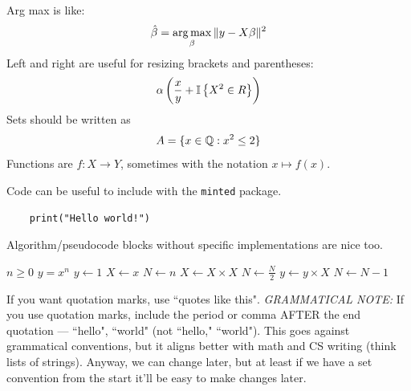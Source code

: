 \documentclass[../../main.tex]{subfiles}
\begin{document}
Arg max is like:
\begin{equation*}
    \hat \beta=\operatorname*{arg\,max}_\beta \Vert y-X\beta\Vert^2
\end{equation*}
Left and right are useful for resizing brackets and parentheses:
\begin{equation*}
    \alpha\left(\frac{x}{y}+\mathbb{I}\left\{X^2\in R\right\}\right)
\end{equation*}
Sets should be written as
\begin{equation*}
    A=\{x\in \mathbb{Q}:x^2\leq 2\}
\end{equation*}
Functions are $f:X\rightarrow Y$, sometimes with the notation $x\mapsto f(x)$.
\newline

\noindent Code can be useful to include with the \texttt{minted} package.
\begin{verbatim}
    print("Hello world!")
\end{verbatim}
\noindent Algorithm/pseudocode blocks without specific implementations are nice too.
\begin{algorithm}
\caption{An algorithm with caption}\label{alg:cap}
\begin{algorithmic}
\Require $n \geq 0$
\Ensure $y = x^n$
\State $y \gets 1$
\State $X \gets x$
\State $N \gets n$
    \State $X \gets X \times X$
    \State $N \gets \frac{N}{2}$  
    \State $y \gets y \times X$
    \State $N \gets N - 1$
\EndIf
\EndWhile
\end{algorithmic}
\end{algorithm}

If you want quotation marks, use ``quotes like this". \textit{GRAMMATICAL NOTE:} If you use quotation marks, include the period or comma AFTER the end quotation --- ``hello", ``world" (not ``hello," ``world"). This goes against grammatical conventions, but it aligns better with math and CS writing (think lists of strings). Anyway, we can change later, but at least if we have a set convention from the start it'll be easy to make changes later. 

\printbibliography[
    heading=subbibintoc,
    title={References}
]
\end{document}
